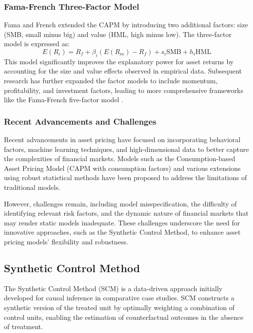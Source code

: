 \subsubsection{Fama-French Three-Factor Model}
Fama and French \cite{Fama1993} extended the CAPM by introducing two additional factors: size (SMB, small minus big) and value (HML, high minus low). The three-factor model is expressed as:
\[
E(R_i) = R_f + \beta_i (E(R_m) - R_f) + s_i \text{SMB} + h_i \text{HML}
\]
This model significantly improves the explanatory power for asset returns by accounting for the size and value effects observed in empirical data. Subsequent research has further expanded the factor models to include momentum, profitability, and investment factors, leading to more comprehensive frameworks like the Fama-French five-factor model \cite{Fama2015}.

\subsubsection{Recent Advancements and Challenges}
Recent advancements in asset pricing have focused on incorporating behavioral factors, machine learning techniques, and high-dimensional data to better capture the complexities of financial markets. Models such as the Consumption-based Asset Pricing Model (CAPM with consumption factors) \cite{Ludvigson2004} and various extensions using robust statistical methods \cite{Ang2014} have been proposed to address the limitations of traditional models.

However, challenges remain, including model misspecification, the difficulty of identifying relevant risk factors, and the dynamic nature of financial markets that may render static models inadequate. These challenges underscore the need for innovative approaches, such as the Synthetic Control Method, to enhance asset pricing models' flexibility and robustness.

\subsection{Synthetic Control Method}

The Synthetic Control Method (SCM) \cite{Abadie2010, Abadie2015} is a data-driven approach initially developed for causal inference in comparative case studies. SCM constructs a synthetic version of the treated unit by optimally weighting a combination of control units, enabling the estimation of counterfactual outcomes in the absence of treatment.

